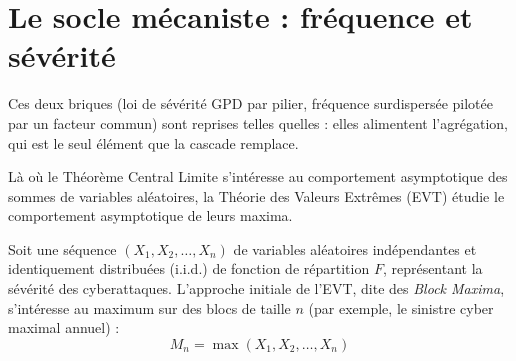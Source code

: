 \chapter{Le socle mécaniste : fréquence et sévérité}
\label{chap:socle}

\noindent Ces deux briques (loi de sévérité GPD par pilier, fréquence surdispersée pilotée par
un facteur commun) sont reprises telles quelles : elles alimentent l'agrégation, qui est le
seul élément que la cascade remplace.


Là où le Théorème Central Limite s'intéresse au comportement asymptotique des sommes de variables aléatoires, la Théorie des Valeurs Extrêmes (EVT) étudie le comportement asymptotique de leurs maxima.

Soit une séquence $(X_1, X_2, \dots, X_n)$ de variables aléatoires indépendantes et identiquement distribuées (i.i.d.) de fonction de répartition $F$, représentant la sévérité des cyberattaques. L'approche initiale de l'EVT, dite des \textit{Block Maxima}, s'intéresse au maximum sur des blocs de taille $n$ (par exemple, le sinistre cyber maximal annuel) :
\begin{equation}
M_n = \max(X_1, X_2, \dots, X_n)
\end{equation}

